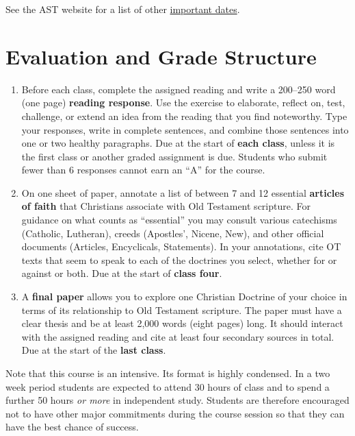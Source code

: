 \documentclass[titlepage]{article}
\begin{document}
See the AST website for a list of other \href{http://www.astheology.ns.ca/students/academic-dates.html}{important dates}.

\section{Evaluation and Grade Structure}
\label{evaluation}

\begin{enumerate}%

	\item Before each class, complete the assigned reading and write a
	200--250 word (one page) \textbf{reading response}. Use the exercise
	to elaborate, reflect on, test, challenge, or extend an idea from
	the reading that you find noteworthy. Type your responses, write in
	complete sentences, and combine those sentences into one or two
	healthy paragraphs. Due at the start of \textbf{each class}, unless
	it is the first class or another graded assignment is due. Students
	who submit fewer than 6 responses cannot earn an “A” for the course.

	\item On one sheet of paper, annotate a list of between 7 and 12
	essential \textbf{articles of faith} that Christians associate with
	Old Testament scripture. For guidance on what counts as “essential”
	you may consult various catechisms (Catholic, Lutheran), creeds
	(Apostles', Nicene, New), and other official documents (Articles,
	Encyclicals, Statements). In your annotations, cite OT texts that
	seem to speak to each of the doctrines you select, whether for or
	against or both. Due at the start of \textbf{class four}.

	\item A \textbf{final paper} allows you to explore one Christian
	Doctrine of your choice in terms of its relationship to Old
	Testament scripture. The paper must have a clear thesis and be at
	least 2,000 words (eight pages) long. It should interact with the
	assigned reading and cite at least four secondary sources in total.
	Due at the start of the \textbf{last class}.

\end{enumerate}

Note that this course is an intensive. Its format is highly condensed.
In a two week period students are expected to attend 30 hours of class
and to spend a further 50 hours \emph{or more} in independent study.
Students are therefore encouraged not to have other major commitments
during the course session so that they can have the best chance of
success.
\end{document}
